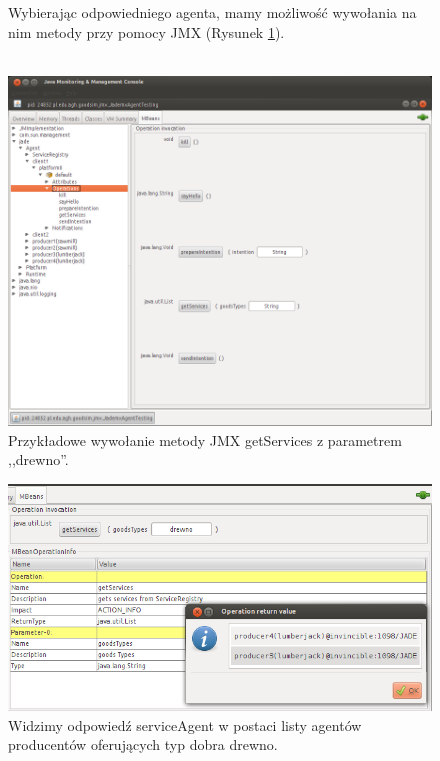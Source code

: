 \documentclass[a4paper,12pt]{article}
\begin{document}
\begin{figure}[!p]
Wybierając odpowiedniego agenta, mamy możliwość wywołania na nim metody przy pomocy JMX (Rysunek \ref{conf4}).
\\ \\
\begin{center}
\includegraphics[scale=0.5]{gfx/PlatformaWymianyDobr-img8.png}
\caption{Przykładowe wywołanie metody JMX getServices z parametrem ,,drewno''.}
\label{conf4}
\end{center}
\end{figure}

\begin{figure}[!p]
\begin{center}
\includegraphics[scale=0.6]{gfx/PlatformaWymianyDobr-img9.png}
\caption{Widzimy odpowiedź serviceAgent w postaci listy agentów producentów oferujących typ dobra drewno.}
\label{conf5}
\end{center}
\end{figure}
\end{document}
